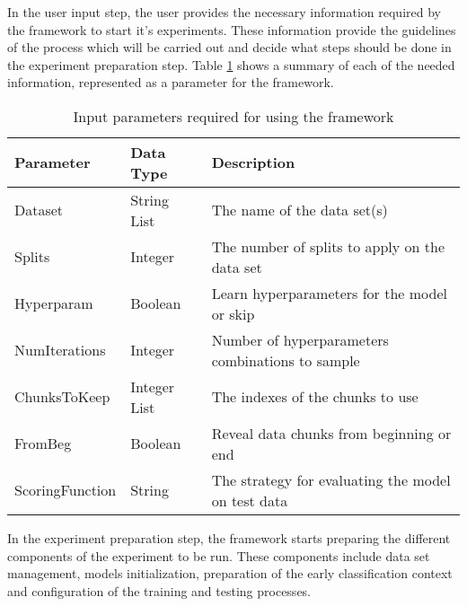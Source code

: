 In the user input step, the user provides the necessary information required by the framework to start it's experiments.
These information provide the guidelines of the process which will be carried out and decide what steps should be done in the
experiment preparation step.
Table \ref{TableUserInput} shows a summary of each of the needed information, represented as a parameter for the framework.
\begin{table}
    \centering
    \begin{tabular}{|l|l|l|}
    \hline
    \multicolumn{1}{|l|}{Parameter} & Data Type          & Description                                        \\ \hline
    Dataset                         & String List        & The name of the data set(s)                        \\ \hline
    Splits                          & Integer            & The number of splits to apply on the data set      \\ \hline
    Hyperparam                      & Boolean            & Learn hyperparameters for the model or skip        \\ \hline
    NumIterations                   & Integer            & Number of hyperparameters combinations to sample   \\ \hline
    ChunksToKeep                    & Integer List       & The indexes of the chunks to use                   \\ \hline
    FromBeg                         & Boolean            & Reveal data chunks from beginning or end           \\ \hline
    ScoringFunction                 & String             & The strategy for evaluating the model on test data \\ \hline
    \end{tabular}
    \caption{Input parameters required for using the framework}
    \label{TableUserInput}
\end{table}

In the experiment preparation step, the framework starts preparing the different components of the experiment to be run.
These components include data set management, models initialization, preparation of the early classification context
and configuration of the training and testing processes.

